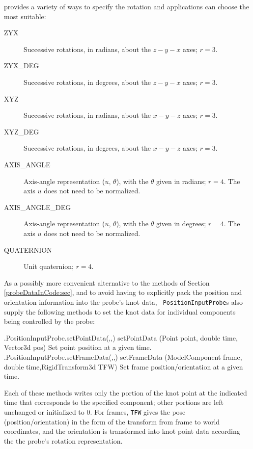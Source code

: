  provides a variety of ways
to specify the rotation and applications can choose the most suitable:

\begin{description}

\item[ZYX]\mbox{}

Successive rotations, in radians, about the $z-y-x$ axes; $r = 3$.

\item[ZYX\_DEG]\mbox{}

Successive rotations, in degrees, about the $z-y-x$ axes; $r = 3$.

\item[XYZ]\mbox{}

Successive rotations, in radians, about the $x-y-z$ axes; $r = 3$.

\item[XYZ\_DEG]\mbox{}

Successive rotations, in degrees, about the $x-y-z$ axes; $r = 3$.

\item[AXIS\_ANGLE]\mbox{}

Axis-angle representation ($u$, $\theta$), with the $\theta$ given in
radians; $r = 4$. The axis $u$ does not need to be normalized.

\item[AXIS\_ANGLE\_DEG]\mbox{}

Axis-angle representation ($u$, $\theta$), with the $\theta$ given in
degrees; $r = 4$. The axis $u$ does not need to be normalized.

\item[QUATERNION]\mbox{}

Unit quaternion; $r = 4$.

\end{description}

As a possibly more convenient alternative to the methods of
Section \ref{probeDataInCode:sec}, and to avoid having to explicitly pack the
position and orientation information into the probe's knot data, {\tt
PositionInputProbe}s also supply the following methods to set the knot data for
individual components being controlled by the probe:

%
\begin{methodtable}{0.7}{0.3}
\midline
%
\methodentry
{\probes.PositionInputProbe.setPointData(,,)}%
{setPointData (Point point, double time, Vector3d pos)}%
{Set point position at a given time.}%
%
\methodentry
{\probes.PositionInputProbe.setFrameData(,,)}%
{setFrameData (ModelComponent frame, double time,\brh RigidTransform3d TFW)}%
{Set frame position/orientation at a given time.}%
%
\midline
\end{methodtable}
%
Each of these methods writes only the portion of the knot point at the
indicated time that corresponds to the specified component; other portions are
left unchanged or initialized to 0. For frames, {\tt TFW} gives the pose
(position/orientation) in the form of the transform from frame to world
coordinates, and the orientation is transformed into knot point data according
the the probe's rotation representation.

